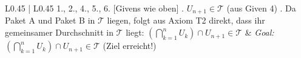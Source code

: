 \documentclass{article}
\begin{document}
\begin{center}
\begin{tabular}{ L{0.45\textwidth} | L{0.45\textwidth} }
1., 2., 4., 5., 6. [Givens wie oben] . $U_{n+1} \in \mathcal{T}$ (aus Given 4) . Da Paket A und Paket B in $\mathcal{T}$ liegen, folgt aus Axiom T2 direkt, dass ihr gemeinsamer Durchschnitt in $\mathcal{T}$ liegt: \newline
$\left( \bigcap_{k=1}^n U_k \right) \cap U_{n+1} \in \mathcal{T}$ &
\emph{Goal:} $\left( \bigcap_{k=1}^n U_k \right) \cap U_{n+1} \in \mathcal{T}$ \newline
\newline
\checkmark \quad (Ziel erreicht!) \\
\bottomrule
\end{tabular}
\end{center}
\end{document}
